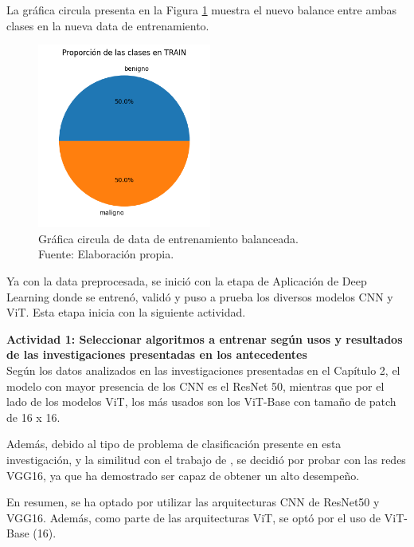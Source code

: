 La gráfica circula presenta en la Figura \ref{4:fig119} muestra el nuevo balance entre ambas clases en la nueva data de entrenamiento.

\begin{figure}[H]
	\begin{center}
		\includegraphics[width=0.51\textwidth]{4/figures/balanced_circular.png}
		\caption[Gráfica circula de data de entrenamiento balanceada]{Gráfica circula de data de entrenamiento balanceada. \\
		Fuente: Elaboración propia.}
		\label{4:fig119}
	\end{center}
\end{figure}

Ya con la data preprocesada, se inició con la etapa de Aplicación de Deep Learning donde se entrenó, validó y puso a prueba los diversos modelos CNN y ViT. Esta etapa inicia con la siguiente actividad.

\textbf{Actividad 1: Seleccionar algoritmos a entrenar según usos y resultados de las investigaciones presentadas en los antecedentes}
\\
Según los datos analizados en las investigaciones presentadas en el Capítulo 2, el modelo con mayor presencia de los CNN es el ResNet 50, mientras que por el lado de los modelos ViT, los más usados son los ViT-Base con tamaño de patch de 16 x 16.

Además, debido al tipo de problema de clasificación presente en esta investigación, y la similitud con el trabajo de \cite{pr_JERBI2023autoclassViTGAN}, se decidió por probar con las redes VGG16, ya que ha demostrado ser capaz de obtener un alto desempeño.

En resumen, se ha optado por utilizar las arquitecturas CNN de ResNet50 y VGG16. Además, como parte de las arquitecturas ViT, se optó por el uso de ViT-Base (16).

